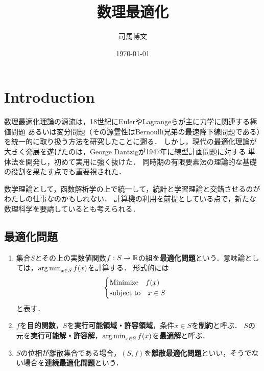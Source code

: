 \documentclass[uplatex,dvipdfmx]{jsreport}
\title{数理最適化}
\author{司馬博文}
\date{\today}
\begin{document}
\tableofcontents

\chapter{Introduction}

\begin{history}[ORの華]
    数理最適化理論の源流は，18世紀にEulerやLagrangeらが主に力学に関連する極値問題
    あるいは変分問題（その源霊性はBernoulli兄弟の最速降下線問題である）を統一的に取り扱う方法を研究したことに遡る．
    しかし，現代の最適化理論が大きく発展を遂げたのは，George Dantzigが1947年に線型計画問題に対する
    単体法を開発し，初めて実用に強く抜けた．
    同時期の有限要素法の理論的な基礎の役割を果たす点でも重要視された．

    数学理論として，函数解析学の上で統一して，統計と学習理論と交錯させるのがわたしの仕事なのかもしれない．
    計算機の利用を前提としている点で，新たな数理科学を要請しているとも考えられる．
\end{history}

\section{最適化問題}

\begin{definition}\mbox{}
    \begin{enumerate}
        \item 集合$S$とその上の実数値関数$f:S\to\mathbb{R}$の組を\textbf{最適化問題}という．意味論としては，$\operatorname*{arg\,min}_{x\in S}f(x)$を計算する．
        形式的には
        \[\begin{cases}
            \text{Minimize}\quad f(x)\\
            \text{subject to}\quad x\in S
        \end{cases}\]
        と表す．
        \item $f$を\textbf{目的関数}，$S$を\textbf{実行可能領域・許容領域}，条件$x\in S$を\textbf{制約}と呼ぶ．
        $S$の元を\textbf{実行可能解・許容解}，$\operatorname*{arg\,min}_{x\in S}f(x)$を\textbf{最適解}と呼ぶ．
        \item $S$の位相が離散集合である場合，$(S,f)$を\textbf{離散最適化問題}といい，そうでない場合を\textbf{連続最適化問題}という．
    \end{enumerate}
\end{definition}

\begin{example}[輸送問題]
    
\end{example}
\end{document}

